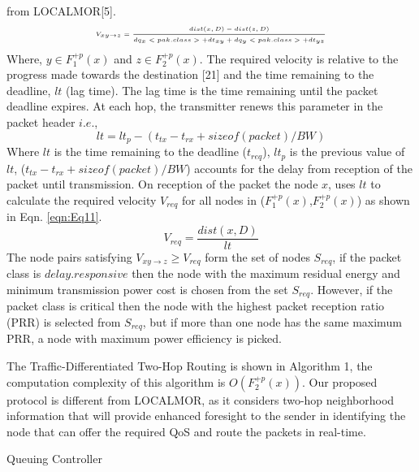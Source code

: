 \documentclass[fleqn,twoside]{article}
\begin{document}
from LOCALMOR[5].
\begin{equation}
\begin{tiny}
\begin{split}
V_{xy\rightarrow z} = \frac{dist(x,D) - dist(z,D)}{dq_x<pak.class> + dt_{xy} + dq_y<pak.class> + dt_{yz}}
\end{split}
\label{eqn:Eq9}
\end{tiny}
\end{equation}
Where, $y \in F_1^{+p}(x)$ and $z \in F_2^{+p}(x)$. The required velocity is relative to the progress made towards the destination
[21] and the time remaining to the deadline, $lt$ (lag time). The lag time is the time remaining until the packet deadline expires. At each hop, the transmitter renews this parameter in the packet header $i.e.$,
\begin{equation}
lt = lt_{p} - (t_{tx} - t_{rx} + sizeof(packet)/BW)
\label{eqn:Eq10}
\end{equation}
Where $lt$ is the time remaining to the deadline ($t_{req}$), $lt_{p}$ is the previous value 
of $lt$, ($t_{tx} - t_{rx} + sizeof(packet)/BW$) accounts for the delay 
from reception of the packet until transmission. On reception of the packet the node $x$, uses $lt$ to calculate the 
required velocity $V_{req}$ for all nodes in ($F_1^{+p}(x)$,$F_2^{+p}(x)$) as shown in Eqn. \ref{eqn:Eq11}.
\begin{equation}
V_{req} = \frac{dist(x,D)}{lt}
\label{eqn:Eq11}
\end{equation}
The node pairs satisfying $V_{xy\rightarrow z} \geq V_{req}$ form the set of nodes $S_{req}$, if the packet class
is $delay.responsive$ then the node with the maximum residual energy and minimum transmission power cost is chosen from the
set $S_{req}$. However, if the packet class is critical then the node with the highest packet reception ratio (PRR) is
selected from $S_{req}$, but if more than one node has the same maximum PRR, a node with maximum power efficiency is picked.

The Traffic-Differentiated Two-Hop Routing is shown in Algorithm 1, the computation complexity of this 
algorithm is $O(F_2^{+p}(x))$. Our proposed protocol is different from LOCALMOR, as it considers
two-hop neighborhood information that will provide enhanced foresight to the sender in identifying the node that can 
offer the required QoS and route the packets in real-time.

\begin{algorithm}
\begin{footnotesize}
\BlankLine
{}
\caption{Queuing Controller}
\label{algo:qm}
\end{footnotesize}
\end{algorithm}
\end{document}
